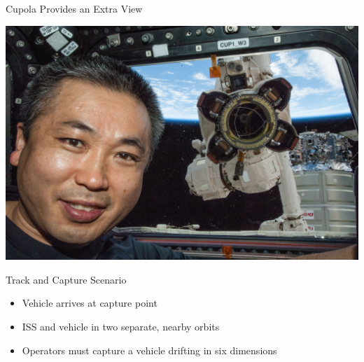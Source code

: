 \documentclass[10pt]{beamer}
\begin{document}
\begin{frame}[fragile]{Cupola Provides an Extra View}
  \begin{center}
    \includegraphics[width=\textwidth]{../img/12085915275_c7f77c537e_k.jpg}
  \end{center}
\end{frame}

\begin{frame}[fragile]{Track and Capture Scenario}
  \begin{itemize}
    \setlength\itemsep{1em}
    \item Vehicle arrives at capture point
    \item ISS and vehicle in two separate, nearby orbits
    \item Operators must capture a vehicle drifting in six dimensions
  \end{itemize}
\end{frame}
\end{document}
